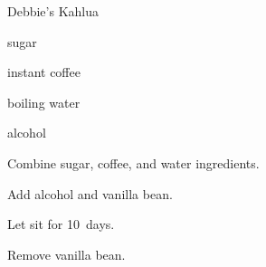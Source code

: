 \begin{recipe}{Debbie's Kahlua}{}{}

\begin{ingredients}
\item {} sugar
\item {} instant coffee
\item {} boiling water
\item {} alcohol
\end{ingredients}

\begin{directions}
\item Combine sugar, coffee, and water ingredients.
\item Add alcohol and vanilla bean.
\item Let sit for 10~days.
\item Remove vanilla bean.
\end{directions}

\end{recipe}
